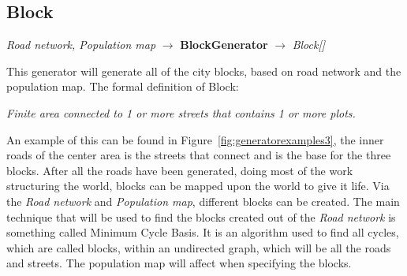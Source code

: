 \subsection{Block}
\begin{center}
    \textit{Road network, Population map} $\rightarrow$ \textbf{BlockGenerator} $\rightarrow$ \textit{Block{[}{]}}
\end{center}
This generator will generate all of the city blocks, based on road network and the population map.
The formal definition of Block:
\begin{center}
    \textit{Finite area connected to 1 or more streets that contains 1 or more plots.}
\end{center}
An example of this can be found in Figure~\ref{fig:generatorexamples3}, the inner roads of the center area is the streets that connect and is the base for the three blocks.
After all the roads have been generated, doing most of the work structuring the world, blocks can be mapped upon the world to give it life.
Via the \textit{Road network} and \textit{Population map}, different blocks can be created. 
The main technique that will be used to find the blocks created out of the \textit{Road network} is something called Minimum Cycle Basis.
It is an algorithm used to find all cycles, which are called blocks, within an undirected graph, which will be all the roads and streets. 
The population map will affect when specifying the blocks. 